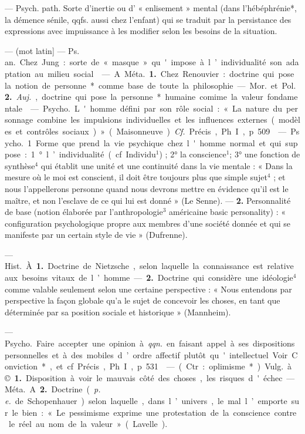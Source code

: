\begin{itemize}[leftmargin=1cm, label=, itemsep=1pt]
 — Psych. path. Sorte
d'inertie ou d’ « enlisement » mental
(dans l'hébéphrénie*, la démence
sénile, qqfs. aussi chez l'enfant) qui
se traduit par la persistance des
expressions avec impuissance à les
modifier selon les besoins de la situation.

 — (mot latin] — \si{Ps. an.} Chez
Jung : sorte de « masque » qu'impose
à l’individualité son adaptation au
milieu social.

 — A. \si{Méta.} {\bf 1.} Chez
Renouvier : doctrine qui pose la notion de personne* comme base de
toute la philosophie. — \si{Mor.} et \si{Pol.}
 {\bf 2.} {\it Auj.}, doctrine qui pose la personne* humaine comime la valeur
fondamentale.

 — \si{Psycho.} L'homme défini par son rôle social : « La nature
du personnage combine les impulsions individuelles et les influences
externes (modèles et contrôles sociaux) » (Maisonneuve). {\it Cf.} Précis,
Ph. I, p. 509.

 — \si{Psycho.}
1. Forme que prend.la vie psychique
chez l'homme normal et qui suppose : 1° l’individualité (cf. Individu$^1$) ; 2° la conscience$^1$; 3° une
fonction de synthèse$^4$ qui établit une
unité et une continuité dans la vie
mentale : « Dans la mesure où le moi
est conscient, il doit être toujours
plus que simple sujet$^4$ ; et nous l’appellerons personne quand nous devrons mettre en évidence qu'il est
le maître, et non l’esclave de ce qui
lui est donné » (Le Senne). — {\bf 2.} Personnalité
de base (notion élaborée
par l'anthropologie$^3$ américaine
basic personality) : « configuration
psychologique propre aux membres
d’une société donnée et qui se manifeste par un certain style de vie »
(Dufrenne).

 — \si{Hist.} À. {\bf 1.} Doctrine
de Nietzsche, selon laquelle la
connaissance est relative aux besoins
vitaux de l’homme. — {\bf 2.} Doctrine qui
considère une idéologie$^4$ comme
valable seulement selon une certaine perspective : « Nous entendons
par perspective la façon globale qu’a
le sujet de concevoir les choses, en
tant que déterminée par sa position
sociale et historique » (Mannheim).

 — \si{Psycho.} Faire accepter
une opinion à {\it qqn.} en faisant appel
à ses dispositions personnelles et à
des mobiles d’ordre affectif plutôt
qu'intellectuel. Voir Conviction*, et
cf. Précis, Ph. I, p. 531.

 — (Ctr. : oplimisme*).
\si{Vulg.} à. © {\bf 1.} Disposition à voir le
mauvais côté des choses, les risques
d'échec. — \si{Méta.} A. {\bf 2.} Doctrine
({\it p. e.} de Schopenhauer) selon laquelle,
dans l’univers, le mal l’emporte sur
le bien : « Le pessimisme exprime
une protestation de la conscience
contre le réel au nom de la valeur »
(Lavelle).


\end{itemize}
